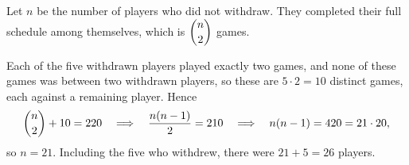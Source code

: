 Let $n$ be the number of players who did not withdraw. They completed their full schedule among themselves, which is $\dbinom n2$ games.

Each of the five withdrawn players played exactly two games, and none of these games was between two withdrawn players, so these are $5\cdot2=10$ distinct games, each against a remaining player. Hence
\[\dbinom n2+10=220\quad\Longrightarrow\quad\dfrac{n(n-1)}{2}=210\quad\Longrightarrow\quad n(n-1)=420=21\cdot20,\]
so $n=21$. Including the five who withdrew, there were $21+5=\boxed{26}$ players.
